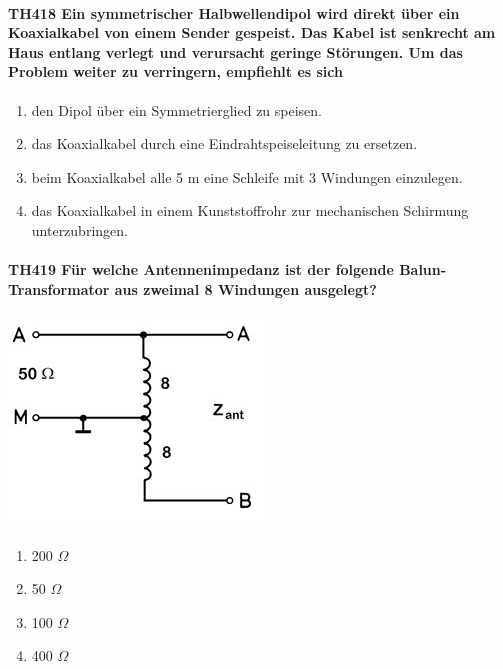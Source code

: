\documentclass[8pt]{article}
\begin{document}
\paragraph*{TH418 Ein symmetrischer Halbwellendipol wird direkt über ein Koaxialkabel von einem Sender gespeist. Das Kabel ist senkrecht am Haus entlang verlegt und verursacht geringe Störungen. Um das Problem weiter zu verringern, empfiehlt es sich}
\begin{enumerate}[nolistsep,label=\Alph*]
\item den Dipol über ein Symmetrierglied zu speisen.
\item das Koaxialkabel durch eine Eindrahtspeiseleitung zu ersetzen.
\item beim Koaxialkabel alle 5 m eine Schleife mit 3 Windungen einzulegen.
\item das Koaxialkabel in einem Kunststoffrohr zur mechanischen Schirmung unterzubringen.
\end{enumerate}

\paragraph*{TH419 Für welche Antennenimpedanz ist der folgende Balun-Transformator aus zweimal 8 Windungen ausgelegt?}
\begin{center}
	\begin{minipage}{\linewidth}
		\centering
		\includegraphics[scale=1.0]{pics/th419_a.jpg}
	\end{minipage}
\end{center}
\begin{enumerate}[nolistsep,label=\Alph*]
\item 200 $\Omega$
\item 50 $\Omega$
\item 100 $\Omega$
\item 400 $\Omega$
\end{enumerate}
\end{document}
